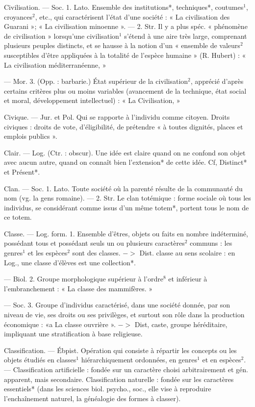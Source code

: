 Civilisation. — Soc. 1. Lato. Ensemble
des institutions*, techniques*, coutumes$^1$, croyances$^2$, etc., qui caractérisent l’état d’une société : « La
civilisation des Guarani »; « La
civilisation minoenne ». — 2. Str.
Il y a plus spéc. « phénomène de
civilisation » lorsqu'une civilisation$^1$
s’étend à une aire très large, comprenant plusieurs peuples distincts, et
se hausse à la notion d’un « ensemble
de valeurs$^2$ susceptibles d’être appliquées à la totalité de l'espèce
humaine » (R. Hubert) : « La civilisation méditerranéenne, »

— Mor. 3. (Opp. : barbarie.) État
supérieur de la civilisation$^2$, apprécié d’après certains critères plus ou
moins variables (avancement de la
technique, état social et moral, développement intellectuel) : « La Civilisation, »

Civique. — Jur. et Pol. Qui se rapporte à l'individu comme citoyen.
Droits civiques : droits de vote,
d'éligibilité, de prétendre « à toutes
dignités, places et emplois publics ».

Clair. — Log. (Ctr. : obscur). Une idée
est claire quand on ne confond son
objet avec aucun autre, quand on
connaît bien l’extension* de cette
idée. Cf, Distinct* et Présent*.

Clan. — Soc. 1. Lato. Toute société
où la parenté résulte de la communauté du nom (vg. la gens romaine).
— 2. Str. Le clan totémique : forme
sociale où tous les individus, se
considérant comme issus d’un même
totem*, portent tous le nom de ce
totem.

Classe. — Log. form. 1. Ensemble
d'êtres, objets ou faits en nombre
indéterminé, possédant tous et possédant seuls un ou plusieurs caractères$^2$ communs : les genres$^1$ et les
espèces$^2$ sont des classes. $->$ Dist.
classe au sens scolaire : en Log., une
classe d’élèves est une collection*.

— Biol. 2. Groupe morphologique supérieur à l’ordre$^8$ et inférieur à l’embranchement : « La classe
des mammifères. »

— Soc. 3. Groupe d'individus
caractérisé, dans une société donnée,
par son niveau de vie, ses droits ou
ses privilèges, et surtout son rôle
dans la production économique :
«a La classe ouvrière ». $->$ Dist,
caste, groupe héréditaire, impliquant
une stratification à base religieuse.

Classification. — Ébpist. Opération qui
consiste à répartir les concepts ou
les objets étudiés en classes$^1$ hiérarchiquement ordonnées, en genres$^1$
et en espèces$^2$. — Classification artificielle : fondée sur un caractère
choisi arbitrairement et gén. apparent, mais secondaire. Classification
naturelle : fondée sur les caractères
essentiels* (dans les sciences biol.
psycho., soc., elle vise à reproduire
l’enchaînement naturel, la généalogie des formes à classer).


